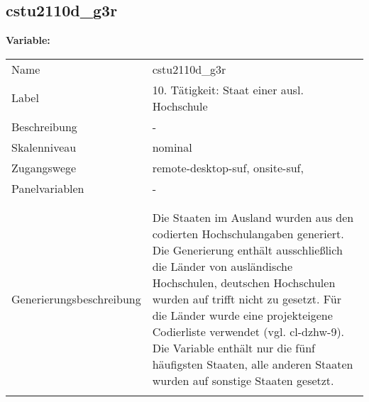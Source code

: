 	
	
	\subsection{cstu2110d\_g3r}
	\label{subSection:cstu2110d_g3r}

	\noindent\textbf{Variable:}\\
		\begin{tabular}{lL{11.3cm}}
			\label{tableVariable:cstu2110d_g3r}
			Name & cstu2110d\_g3r \\
			Label & 10. Tätigkeit: Staat einer ausl. Hochschule \\
			Beschreibung & - \\
			Skalenniveau & nominal \\
			Zugangswege &
				remote-desktop-suf,
				onsite-suf,
 \\
			Panelvariablen & -
			 \\
			 \\
 \\
					Generierungsbeschreibung & Die Staaten im Ausland wurden aus den codierten Hochschulangaben generiert. Die Generierung enthält ausschließlich die Länder von ausländische Hochschulen, deutschen Hochschulen wurden auf trifft nicht zu gesetzt. Für die Länder wurde eine projekteigene Codierliste verwendet (vgl. cl-dzhw-9). Die Variable enthält nur die fünf häufigsten Staaten, alle anderen Staaten wurden auf sonstige Staaten gesetzt. 
				 \\	
			 \\
		\end{tabular}






